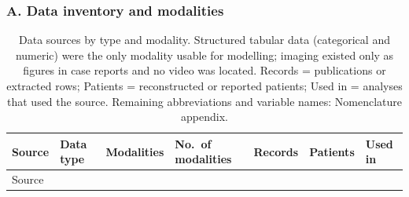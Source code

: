 \documentclass[
  11pt,
]{article}
\begin{document}
\subsubsection{A. Data inventory and
modalities}\label{a.-data-inventory-and-modalities}

\begin{longtable}[]{@{}
  >{\raggedright\arraybackslash}p{}
  >{\raggedright\arraybackslash}p{}
  >{\raggedright\arraybackslash}p{}
  >{\raggedright\arraybackslash}p{}
  >{\raggedright\arraybackslash}p{}
  >{\raggedright\arraybackslash}p{}
  >{\raggedright\arraybackslash}p{}@{}}
\caption{Data sources by type and modality. Structured tabular data
(categorical and numeric) were the only modality usable for modelling;
imaging existed only as figures in case reports and no video was
located. Records = publications or extracted rows; Patients =
reconstructed or reported patients; Used in = analyses that used the
source. Remaining abbreviations and variable names: Nomenclature
appendix.}\tabularnewline
\toprule\noalign{}
\begin{minipage}[b]{\linewidth}\raggedright
Source
\end{minipage} & \begin{minipage}[b]{\linewidth}\raggedright
Data type
\end{minipage} & \begin{minipage}[b]{\linewidth}\raggedright
Modalities
\end{minipage} & \begin{minipage}[b]{\linewidth}\raggedright
No.~of modalities
\end{minipage} & \begin{minipage}[b]{\linewidth}\raggedright
Records
\end{minipage} & \begin{minipage}[b]{\linewidth}\raggedright
Patients
\end{minipage} & \begin{minipage}[b]{\linewidth}\raggedright
Used in
\end{minipage} \\
\midrule\noalign{}
\endfirsthead
\toprule\noalign{}
\begin{minipage}[b]{\linewidth}\raggedright
Source
\end{minipage} & \begin{minipage}[b]{\linewidth}\raggedright

\end{minipage}
\end{longtable}
\end{document}
